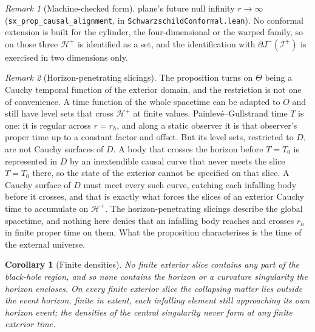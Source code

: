 \documentclass[11pt,a4paper]{article}
\theoremstyle{plain}
\newtheorem{corollary}{Corollary}
\theoremstyle{remark}
\newtheorem{remark}{Remark}
\begin{document}
\begin{remark}[Machine-checked form]
plane's future null infinity $r\to\infty$ (\texttt{sx\_prop\_causal\_alignment}, in \texttt{SchwarzschildConformal.lean}). No conformal extension is built for the cylinder, the four-dimensional or the warped family, so on those three $\mathcal{H}^+$ is identified as a set, and the identification with $\partial J^-(\mathscr{I}^+)$ is exercised in two dimensions only.
\end{remark}

\begin{remark}[Horizon-penetrating slicings]\label{rem:penetrating}
The proposition turns on $\Theta$ being a Cauchy temporal function of the exterior domain, and the restriction is not one of convenience. A time function of the whole spacetime can be adapted to $O$ and still have level sets that cross $\mathcal{H}^+$ at finite values. Painlev\'e--Gullstrand time $T$ is one: it is regular across $r=r_h$, and along a static observer it is that observer's proper time up to a constant factor and offset. But its level sets, restricted to $D$, are not Cauchy surfaces of $D$. A body that crosses the horizon before $T=T_0$ is represented in $D$ by an inextendible causal curve that never meets the slice $T=T_0$ there, so the state of the exterior cannot be specified on that slice. A Cauchy surface of $D$ must meet every such curve, catching each infalling body before it crosses, and that is exactly what forces the slices of an exterior Cauchy time to accumulate on $\mathcal{H}^+$. The horizon-penetrating slicings describe the global spacetime, and nothing here denies that an infalling body reaches and crosses $r_h$ in finite proper time on them. What the proposition characterises is the time of the external universe.
\end{remark}

\begin{corollary}[Finite densities]\label{cor:densities}
No finite exterior slice contains any part of the black-hole region, and so none contains the horizon or a curvature singularity the horizon encloses. On every finite exterior slice the collapsing matter lies outside the event horizon, finite in extent, each infalling element still approaching its own horizon event; the densities of the central singularity never form at any finite exterior time.
\end{corollary}
\end{document}
